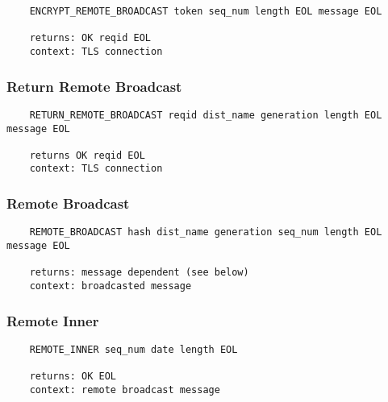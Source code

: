 \documentclass[letterpaper,11pt,oneside]{article}
\begin{document}
\vspace{10pt}
\begin{verbatim}
    ENCRYPT_REMOTE_BROADCAST token seq_num length EOL message EOL

    returns: OK reqid EOL
    context: TLS connection
\end{verbatim}
\vspace{10pt}

\subsubsection{Return Remote Broadcast}

\vspace{10pt}
\begin{verbatim}
    RETURN_REMOTE_BROADCAST reqid dist_name generation length EOL message EOL

    returns OK reqid EOL
    context: TLS connection
\end{verbatim}
\vspace{10pt}

\subsubsection{Remote Broadcast}

\vspace{10pt}
\begin{verbatim}
    REMOTE_BROADCAST hash dist_name generation seq_num length EOL message EOL

    returns: message dependent (see below)
    context: broadcasted message
\end{verbatim}
\vspace{10pt}

\subsubsection{Remote Inner}

\vspace{10pt}
\begin{verbatim}
    REMOTE_INNER seq_num date length EOL

    returns: OK EOL
    context: remote broadcast message
\end{verbatim}
\end{document}
